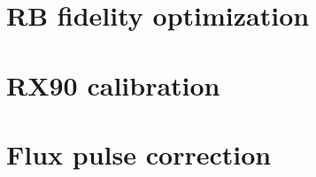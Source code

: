\section{RB fidelity optimization}

\section{RX90 calibration}

\section{Flux pulse correction}
\begin{comment}
    TO DO LIST:
    * calcoli analitic per assunzioni del cryoscope
    * calcoli analitici di convoluzioni per dimostrare che è giusto il modo in cui combiniamo i filtri
    * eventualmente provare ad aggiungere più correzioni esponenziali
\end{comment}
